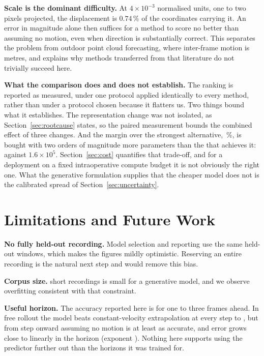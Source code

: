 \documentclass[conference]{IEEEtran}
\begin{document}
\textbf{Scale is the dominant difficulty.} At $4\times10^{-3}$ normalised units, one
to two pixels projected, the displacement is $0.74\,\%$ of the coordinates carrying
it. An error in magnitude alone then suffices for a method to score no better than
assuming no motion, even when direction is substantially correct. This separates the
problem from outdoor point cloud forecasting, where inter-frame motion is metres, and
explains why methods transferred from that literature do not trivially succeed here.

\textbf{What the comparison does and does not establish.} The ranking is reported as
measured, under one protocol applied identically to every method, rather than under a
protocol chosen because it flatters us. Two things bound what it establishes. The
representation change was not isolated, as Section~\ref{sec:rootcause} states, so the
paired measurement bounds the combined effect of three changes. And the margin over
the strongest alternative, \gainOverNext{}\,\%, is bought with two orders of
magnitude more parameters than the \nextMethod{} that achieves it:
\oursParams{} against $1.6\times10^{5}$. Section~\ref{sec:cost} quantifies that
trade-off, and for a deployment on a fixed intraoperative compute budget it is not
obviously the right one. What the generative formulation supplies that the cheaper
model does not is the calibrated spread of Section~\ref{sec:uncertainty}.

\section{Limitations and Future Work}

\textbf{No fully held-out recording.} Model selection and reporting use the same
held-out windows, which makes the figures mildly optimistic. Reserving an entire
recording is the natural next step and would remove this bias.

\textbf{Corpus size.} \numVideos{} short recordings is small for a generative model,
and we observe overfitting consistent with that constraint.

\textbf{Useful horizon.} The accuracy reported here is for one to three frames ahead.
In free rollout the model beats constant-velocity extrapolation at every step to
\rolloutHorizon{}, but from step \rolloutCross{} onward assuming no motion is at
least as accurate, and error grows close to linearly in the horizon (exponent
\growthExp{}). Nothing here supports using the predictor further out than the
horizons it was trained for.
\end{document}
